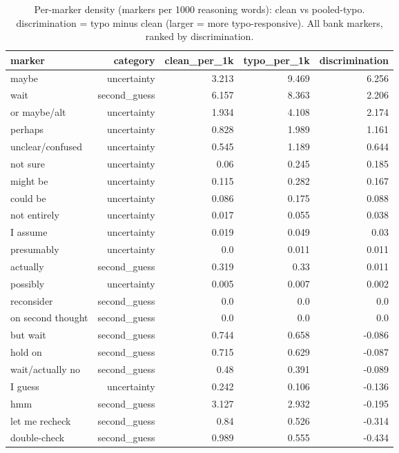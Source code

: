 \documentclass[11pt]{article}
\begin{document}
\begin{table}[H]
\centering
\caption{Per-marker density (markers per 1000 reasoning words): clean vs pooled-typo. discrimination = typo minus clean (larger = more typo-responsive). All bank markers, ranked by discrimination.}
\small
\begin{adjustbox}{max width=\textwidth}
\begin{tabular}{lrrrr}
\toprule
\textbf{marker} & \textbf{category} & \textbf{clean\_per\_1k} & \textbf{typo\_per\_1k} & \textbf{discrimination} \\
\midrule
maybe & uncertainty & 3.213 & 9.469 & 6.256 \\
wait & second\_guess & 6.157 & 8.363 & 2.206 \\
or maybe/alt & uncertainty & 1.934 & 4.108 & 2.174 \\
perhaps & uncertainty & 0.828 & 1.989 & 1.161 \\
unclear/confused & uncertainty & 0.545 & 1.189 & 0.644 \\
not sure & uncertainty & 0.06 & 0.245 & 0.185 \\
might be & uncertainty & 0.115 & 0.282 & 0.167 \\
could be & uncertainty & 0.086 & 0.175 & 0.088 \\
not entirely & uncertainty & 0.017 & 0.055 & 0.038 \\
I assume & uncertainty & 0.019 & 0.049 & 0.03 \\
presumably & uncertainty & 0.0 & 0.011 & 0.011 \\
actually & second\_guess & 0.319 & 0.33 & 0.011 \\
possibly & uncertainty & 0.005 & 0.007 & 0.002 \\
reconsider & second\_guess & 0.0 & 0.0 & 0.0 \\
on second thought & second\_guess & 0.0 & 0.0 & 0.0 \\
but wait & second\_guess & 0.744 & 0.658 & -0.086 \\
hold on & second\_guess & 0.715 & 0.629 & -0.087 \\
wait/actually no & second\_guess & 0.48 & 0.391 & -0.089 \\
I guess & uncertainty & 0.242 & 0.106 & -0.136 \\
hmm & second\_guess & 3.127 & 2.932 & -0.195 \\
let me recheck & second\_guess & 0.84 & 0.526 & -0.314 \\
double-check & second\_guess & 0.989 & 0.555 & -0.434 \\
\bottomrule
\end{tabular}
\end{adjustbox}
\end{table}
\end{document}
